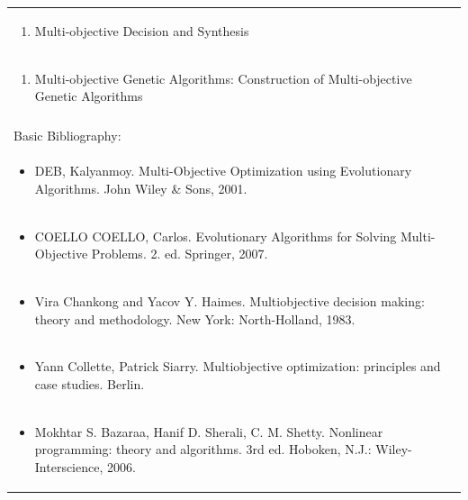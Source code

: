 \documentclass[11pt]{article}
\begin{document}
\begin{center}
\begin{longtable}{|p{4cm}|p{4cm}|p{4cm}|p{4cm}|}
\multicolumn{4}{|p{\dimexpr 16cm + 6\tabcolsep\relax}|}{\begin{enumerate}[start=7]\item Multi-objective Decision and Synthesis\end{enumerate}}\\
\multicolumn{4}{|p{\dimexpr 16cm + 6\tabcolsep\relax}|}{\begin{enumerate}[start=8]\item Multi-objective Genetic Algorithms: Construction of Multi-objective Genetic Algorithms\end{enumerate}}\\
\multicolumn{4}{|p{\dimexpr 16cm + 6\tabcolsep\relax}|}{}\\
\hline
\multicolumn{4}{|p{16cm}|}{Basic Bibliography:}\\*
\multicolumn{4}{|p{\dimexpr 16cm + 6\tabcolsep\relax}|}{\begin{itemize}\item DEB, Kalyanmoy. Multi-Objective Optimization using Evolutionary Algorithms. John Wiley \& Sons, 2001.\end{itemize}}\\
\multicolumn{4}{|p{\dimexpr 16cm + 6\tabcolsep\relax}|}{\begin{itemize}\item COELLO COELLO, Carlos. Evolutionary Algorithms for Solving Multi-Objective Problems. 2. ed. Springer, 2007.\end{itemize}}\\
\multicolumn{4}{|p{\dimexpr 16cm + 6\tabcolsep\relax}|}{\begin{itemize}\item Vira Chankong and Yacov Y. Haimes. Multiobjective decision making: theory and methodology. New York: North-Holland, 1983.\end{itemize}}\\
\multicolumn{4}{|p{\dimexpr 16cm + 6\tabcolsep\relax}|}{\begin{itemize}\item Yann Collette, Patrick Siarry. Multiobjective optimization: principles and case studies. Berlin.\end{itemize}}\\
\multicolumn{4}{|p{\dimexpr 16cm + 6\tabcolsep\relax}|}{\begin{itemize}\item Mokhtar S. Bazaraa, Hanif D. Sherali, C. M. Shetty. Nonlinear programming: theory and algorithms. 3rd ed. Hoboken, N.J.: Wiley-Interscience, 2006.\end{itemize}}\\

\end{longtable}
\end{center}
\end{document}
